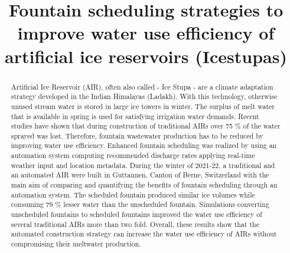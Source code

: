 \documentclass[tc, manuscript]{copernicus}
\begin{document}
\title{Fountain scheduling strategies to improve water use efficiency of artificial
ice reservoirs (Icestupas)}

\def\Authors{Suryanarayanan Balasubramanian\,$^{1,2}$, Martin Hoelzle\,$^{1}$Roger Waser\,$^{3}$, $Martin Von
Burg^{3}\,$}

\def\Address{$^{1}$University of Fribourg, Department of Geosciences, Fribourg, Switzerland $^{2}$University of
Applied Sciences and Arts, Luzern, Switzerland} \def\corrAuthor{Suryanarayanan Balasubramanian}





\maketitle

\begin{abstract}

  Artificial Ice Reservoir (AIR), often also called - Ice Stupa - are a climate adaptation strategy developed in
  the Indian Himalayas (Ladakh). With this technology, otherwise unused stream water is stored in large ice
  towers in winter. The surplus of melt water that is available in spring is used for satisfying irrigation
  water demands. Recent studies have shown that during construction of traditional AIRs over 75 \% of the water
  sprayed was lost. Therefore, fountain wastewater production has to be reduced by improving water use
  efficiency. Enhanced fountain scheduling was realized by using an automation system computing recommended
  discharge rates applying real-time weather input and location metadata. During the winter of 2021-22, a
  traditional and an automated AIR were built in Guttannen, Canton of Berne, Switzerland with the main aim of
  comparing and quantifying the benefits of fountain scheduling through an automation system. The scheduled
  fountain produced similar ice volumes while consuming 79 \% lesser water than the unscheduled fountain.
  Simulations converting unscheduled fountains to scheduled fountains improved the water use efficiency of
  several traditional AIRs more than two fold. Overall, these results show that the automated construction
  strategy can increase the water use efficiency of AIRs without compromising their meltwater production.

\end{abstract}
\end{document}
